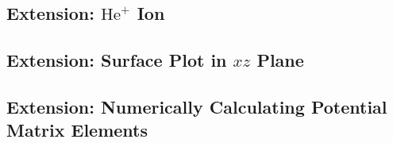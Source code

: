 \documentclass[]{article}
\begin{document}
\subsection{Extension: $\mathrm{He}^{+}$ Ion}
\label{sec:extens-he+-ion}


\subsection{Extension: Surface Plot in $xz$ Plane}
\label{sec:extens-surface-plot-xz}


\subsection{Extension: Numerically Calculating Potential Matrix Elements}
\label{sec:extens-numer-calc-potent}

\end{document}

